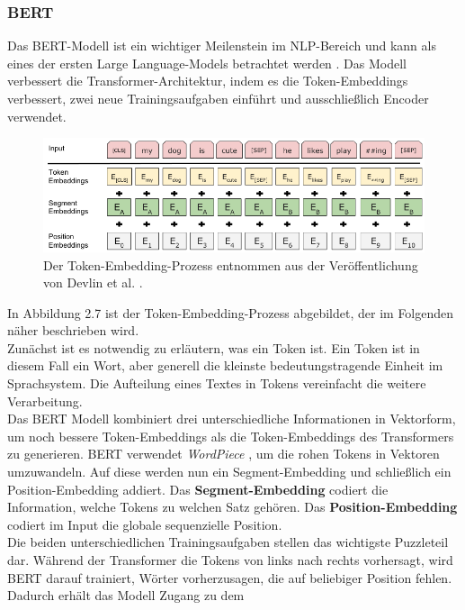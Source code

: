 \documentclass[12pt,letterpaper,ngerman]{article}
\begin{document}
\subsubsection{BERT}
Das BERT-Modell  
ist ein wichtiger Meilenstein im NLP-Bereich und kann 
als eines der ersten Large Language-Models betrachtet werden
\cite{conf/naacl/DevlinCLT19}.
Das Modell verbessert die Transformer-Architektur, 
indem es die Token-Embeddings verbessert, zwei neue Trainingsaufgaben einführt
und ausschließlich Encoder verwendet.
\begin{figure}
  \begin{center}
    \includegraphics[scale=0.5]{abb/BERT-Tokens.png}
  \end{center}
  \caption{
    Der Token-Embedding-Prozess entnommen aus der Veröffentlichung
    von Devlin et al.
    \cite{conf/naacl/DevlinCLT19}.
  }
\end{figure}
In Abbildung 2.7 ist der Token-Embedding-Prozess abgebildet,
der im Folgenden näher beschrieben wird.\\
Zunächst ist es 
notwendig zu erläutern, was ein Token ist. Ein Token ist in 
diesem Fall ein Wort, 
aber generell die kleinste bedeutungstragende Einheit im
Sprachsystem. Die Aufteilung eines Textes in Tokens vereinfacht
die weitere Verarbeitung.\\
Das BERT Modell kombiniert drei unterschiedliche Informationen
in Vektorform, um noch bessere Token-Embeddings als die 
Token-Embeddings des Transformers zu generieren. BERT
verwendet \textit{WordPiece} 
\cite{wu2016googlesneuralmachinetranslation},
um die rohen Tokens in Vektoren umzuwandeln.
Auf diese werden nun ein Segment-Embedding und schließlich ein
Position-Embedding addiert.
Das {\bf Segment-Embedding} codiert die Information,
welche Tokens zu welchen Satz gehören.
Das {\bf Position-Embedding} codiert im Input
die globale sequenzielle Position.\\
Die beiden unterschiedlichen Trainingsaufgaben stellen das 
wichtigste
Puzzleteil dar. Während der Transformer die Tokens von links 
nach rechts
vorhersagt, wird BERT darauf trainiert, Wörter vorherzusagen,
die auf
beliebiger Position fehlen. Dadurch erhält das Modell Zugang zu dem
\end{document}
